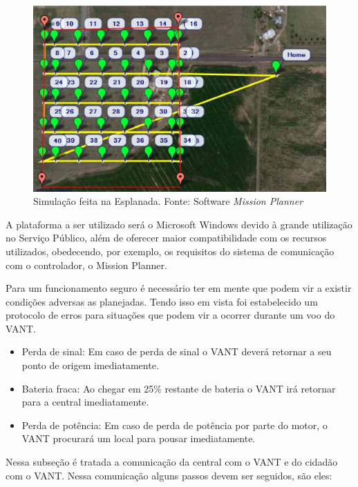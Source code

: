 \begin{figure}[H]
    \centering
	    \includegraphics[keepaspectratio=true,scale=0.8]{figuras/esplanada.eps}
    \caption{Simulação feita na Esplanada. Fonte: Software \textit{Mission Planner}}
    \label{fig:esplanada}
\end{figure}

A plataforma a ser utilizado será o Microsoft Windows devido à grande utilização no Serviço Público, 
além de oferecer maior compatibilidade com os recursos utilizados, obedecendo, por exemplo, os requisitos
do sistema de comunicação com o controlador, o Mission Planner. 

	
Para um funcionamento seguro é necessário ter em mente que podem vir a existir condições adversas as planejadas. Tendo isso em vista foi estabelecido um protocolo de erros para situações que podem vir a ocorrer durante um voo do VANT.

\begin{itemize}
 \item Perda de sinal: Em caso de perda de sinal o VANT deverá retornar a seu ponto de origem imediatamente.
 
 \item Bateria fraca: Ao chegar em 25\% restante de bateria o VANT irá retornar para a central imediatamente.

 \item Perda de potência: Em caso de perda de potência por parte do motor, o VANT procurará um local para pousar imediatamente.

\end{itemize}

Nessa subseção é tratada a comunicação da central com o VANT e do cidadão com o VANT.
Nessa comunicação alguns passos devem ser seguidos, são eles:

